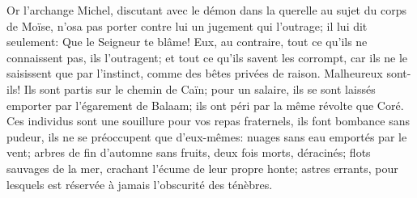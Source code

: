 Or l’archange Michel,
	discutant avec le démon dans la querelle au sujet du corps de Moïse,
	n’osa pas porter contre lui un jugement qui l’outrage;
	il lui dit seulement: Que le Seigneur te blâme!
Eux, au contraire, tout ce qu’ils ne connaissent pas, ils l’outragent;
	et tout ce qu’ils savent les corrompt,
	car ils ne le saisissent que par l’instinct,
	comme des bêtes privées de raison.
Malheureux sont-ils! Ils sont partis sur le chemin de Caïn;
	pour un salaire, ils se sont laissés emporter par l’égarement de Balaam;
	ils ont péri par la même révolte que Coré.
Ces individus sont une souillure pour vos repas fraternels,
	ils font bombance sans pudeur, ils ne se préoccupent que d’eux-mêmes:
	nuages sans eau emportés par le vent;
	arbres de fin d’automne sans fruits, deux fois morts, déracinés;
	flots sauvages de la mer, crachant l’écume de leur propre honte;
	astres errants, pour lesquels est réservée à jamais l’obscurité des ténèbres.
